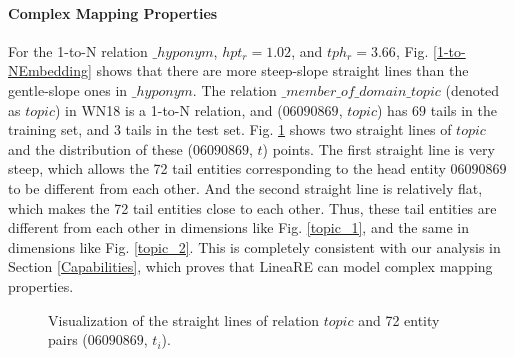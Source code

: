 \documentclass[conference]{IEEEtran}
\begin{document}
\paragraph{Complex Mapping Properties}
For the 1-to-N relation $\_hyponym$, $hpt_r=1.02$, and $tph_r=3.66$, Fig. \ref{1-to-NEmbedding} shows that there are more steep-slope straight lines than the gentle-slope ones in $\_hyponym$. The relation $\_member\_of\_domain\_topic$ (denoted as $topic$) in WN18 is a 1-to-N relation, and ($06090869$, $topic$) has $69$ tails in the training set, and $3$ tails in the test set. Fig. \ref{TopicLine} shows two straight lines of $topic$ and the distribution of these ($06090869$, $t$) points. The first straight line is very steep, which allows the 72 tail entities corresponding to the head entity $06090869$ to be different from each other. And the second straight line is relatively flat, which makes the 72 tail entities close to each other. Thus, these tail entities are different from each other in dimensions like Fig. \ref{topic_1}, and the same in dimensions like Fig. \ref{topic_2}. This is completely consistent with our analysis in Section \ref{Capabilities}, which proves that LineaRE can model complex mapping properties.
\begin{figure}[t]
	\centering
	\caption{
		Visualization of the straight lines of relation $topic$ and 72 entity pairs ($06090869$, $t_i$).
	}
	\label{TopicLine}
\end{figure}
\end{document}
